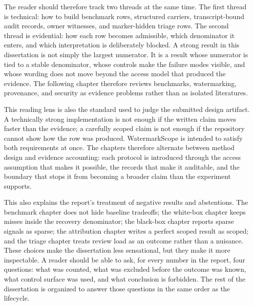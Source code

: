 The reader should therefore track two threads at the same time. The first thread is technical: how to build benchmark rows, structured carriers, transcript-bound audit records, owner witnesses, and marker-hidden triage rows. The second thread is evidential: how each row becomes admissible, which denominator it enters, and which interpretation is deliberately blocked. A strong result in this dissertation is not simply the largest numerator. It is a result whose numerator is tied to a stable denominator, whose controls make the failure modes visible, and whose wording does not move beyond the access model that produced the evidence. The following chapter therefore reviews benchmarks, watermarking, provenance, and security as evidence problems rather than as isolated literatures.

This reading lens is also the standard used to judge the submitted design artifact. A technically strong implementation is not enough if the written claim moves faster than the evidence; a carefully scoped claim is not enough if the repository cannot show how the row was produced. WatermarkScope is intended to satisfy both requirements at once. The chapters therefore alternate between method design and evidence accounting: each protocol is introduced through the access assumption that makes it possible, the records that make it auditable, and the boundary that stops it from becoming a broader claim than the experiment supports.

This also explains the report's treatment of negative results and abstentions. The benchmark chapter does not hide baseline tradeoffs; the white-box chapter keeps misses inside the recovery denominator; the black-box chapter reports sparse signals as sparse; the attribution chapter writes a perfect scoped result as scoped; and the triage chapter treats review load as an outcome rather than a nuisance. These choices make the dissertation less sensational, but they make it more inspectable. A reader should be able to ask, for every number in the report, four questions: what was counted, what was excluded before the outcome was known, what control surface was used, and what conclusion is forbidden. The rest of the dissertation is organized to answer those questions in the same order as the lifecycle.
